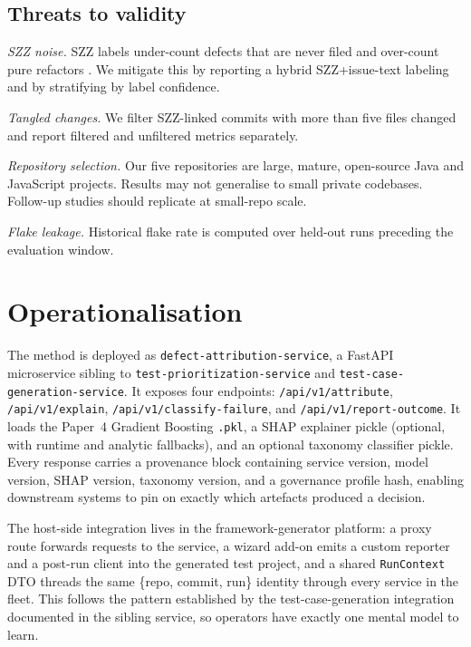 \documentclass[conference]{IEEEtran}
\begin{document}
\subsection{Threats to validity}

\textit{SZZ noise.} SZZ labels under-count defects that are never filed and over-count pure refactors \cite{Herzig2015}. We mitigate this by reporting a hybrid SZZ+issue-text labeling and by stratifying by label confidence.

\textit{Tangled changes.} We filter SZZ-linked commits with more than five files changed and report filtered and unfiltered metrics separately.

\textit{Repository selection.} Our five repositories are large, mature, open-source Java and JavaScript projects. Results may not generalise to small private codebases. Follow-up studies should replicate at small-repo scale.

\textit{Flake leakage.} Historical flake rate is computed over held-out runs preceding the evaluation window.

\section{Operationalisation}
\label{sec:operationalisation}

The method is deployed as \texttt{defect-attribution-service}, a FastAPI microservice sibling to \texttt{test-prioritization-service} and \texttt{test-case-generation-service}. It exposes four endpoints: \texttt{/api/v1/attribute}, \texttt{/api/v1/explain}, \texttt{/api/v1/classify-failure}, and \texttt{/api/v1/report-outcome}. It loads the Paper~4 Gradient Boosting \texttt{.pkl}, a SHAP explainer pickle (optional, with runtime and analytic fallbacks), and an optional taxonomy classifier pickle. Every response carries a provenance block containing service version, model version, SHAP version, taxonomy version, and a governance profile hash, enabling downstream systems to pin on exactly which artefacts produced a decision.

The host-side integration lives in the framework-generator platform: a proxy route forwards requests to the service, a wizard add-on emits a custom reporter and a post-run client into the generated test project, and a shared \texttt{RunContext} DTO threads the same \{repo, commit, run\} identity through every service in the fleet. This follows the pattern established by the test-case-generation integration documented in the sibling service, so operators have exactly one mental model to learn.
\end{document}
